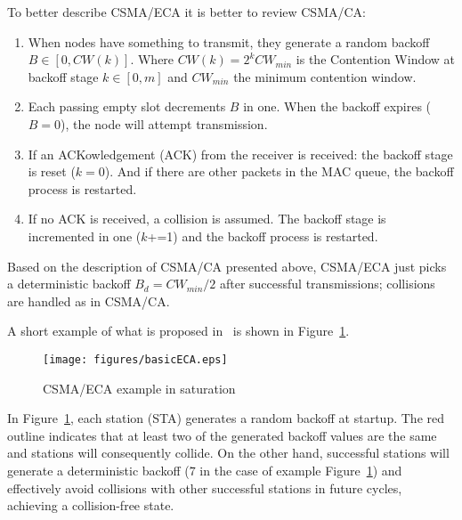\documentclass[conference]{IEEEtran}
\begin{document}
To better describe CSMA/ECA it is better to review CSMA/CA:

\begin{enumerate}
	\item When nodes have something to transmit, they generate a random backoff $B\in[0,CW(k)]$. Where $CW(k)=2^{k}CW_{min}$ is the Contention Window at backoff stage $k\in[0,m]$ and $CW_{min}$ the minimum contention window.
	\item Each passing empty slot decrements $B$ in one. When the backoff expires ($B=0$), the node will attempt transmission.
	\item If an ACKowledgement (ACK) from the receiver is received: the backoff stage is reset ($k=0$). And if there are other packets in the MAC queue, the backoff process is restarted.\label{reset}
	\item If no ACK is received, a collision is assumed. The backoff stage is incremented in one ($k$+=1) and the backoff process is restarted.
\end{enumerate}

Based on the description of CSMA/CA presented above, CSMA/ECA just picks a deterministic backoff $B_{d}=CW_{min}/2$ after successful transmissions; collisions are handled as in CSMA/CA.

A short example of what is proposed in~\cite{barcelo2008lba} is shown in Figure~\ref{Basic-ECA}.


\begin{figure}[htbp]
\centering
  \texttt{[image: figures/basicECA.eps]}
  \caption{CSMA/ECA example in saturation}
  \label{Basic-ECA}
\end{figure}

In Figure~\ref{Basic-ECA}, each station (STA) generates a random backoff at startup. The red outline indicates that at least two of the generated backoff values are the same and stations will consequently collide. On the other hand, successful stations will generate a deterministic backoff ($7$ in the case of example Figure~\ref{Basic-ECA}) and effectively avoid collisions with other successful stations in future cycles, achieving a collision-free state.
\end{document}
